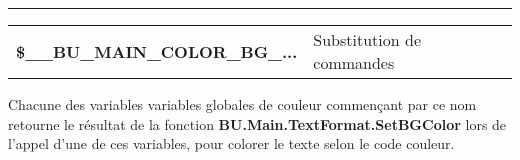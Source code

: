 \documentclass[a4paper,10pt]{article}
\begin{document}

\par\noindent\rule{\textwidth}{0.4pt}

\begin{justify}
    \begin{tabular}{l|l}
        \textbf{\color{vars}\$\_\_BU\_MAIN\_COLOR\_BG\_...} & Substitution de commandes\\
    \end{tabular}
\end{justify}

\begin{justify}
    Chacune des variables variables globales de couleur commençant par ce nom retourne le résultat de la fonction \textbf{\color{func}BU.Main.TextFormat.SetBGColor} lors de l'appel d'une de ces variables, pour colorer le texte selon le code couleur.
\end{justify}
\end{document}
